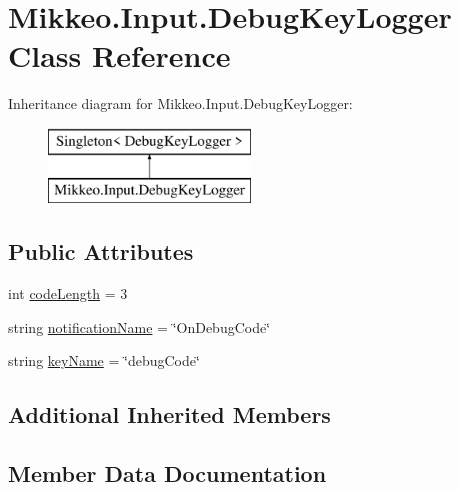 \hypertarget{class_mikkeo_1_1_input_1_1_debug_key_logger}{}\section{Mikkeo.\+Input.\+Debug\+Key\+Logger Class Reference}
\label{class_mikkeo_1_1_input_1_1_debug_key_logger}
Inheritance diagram for Mikkeo.\+Input.\+Debug\+Key\+Logger\+:\begin{figure}[H]
\begin{center}
\leavevmode
\includegraphics[height=2.000000cm]{class_mikkeo_1_1_input_1_1_debug_key_logger}
\end{center}
\end{figure}
\subsection*{Public Attributes}
\begin{DoxyCompactItemize}
\item 
int \hyperlink{class_mikkeo_1_1_input_1_1_debug_key_logger_a6a9f3b9dd9c00c95401470070c3dd737}{code\+Length} = 3
\item 
string \hyperlink{class_mikkeo_1_1_input_1_1_debug_key_logger_a5ce404ce35cc23f447a462ad9a7f4f3a}{notification\+Name} = \char`\"{}On\+Debug\+Code\char`\"{}
\item 
string \hyperlink{class_mikkeo_1_1_input_1_1_debug_key_logger_a844a94c2963305238a87b1fdde6087df}{key\+Name} = \char`\"{}debug\+Code\char`\"{}
\end{DoxyCompactItemize}
\subsection*{Additional Inherited Members}


\subsection{Member Data Documentation}
